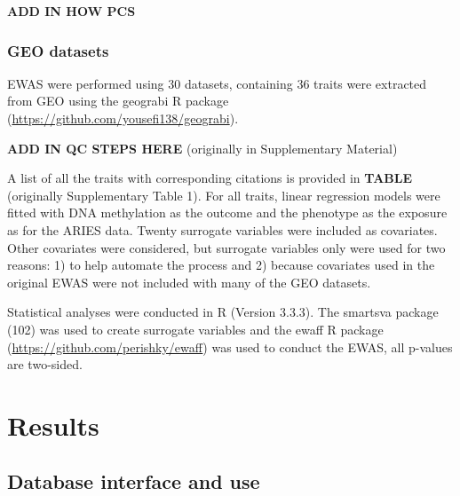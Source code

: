 \documentclass[11pt,twoside]{bristolthesis}
\begin{document}
\textbf{ADD IN HOW PCS}

\hypertarget{geo-datasets}{%
\subsubsection{GEO datasets}\label{geo-datasets}}

EWAS were performed using 30 datasets, containing 36 traits were extracted from GEO using the geograbi R package (\url{https://github.com/yousefi138/geograbi}).

\textbf{ADD IN QC STEPS HERE} (originally in Supplementary Material)

A list of all the traits with corresponding citations is provided in \textbf{TABLE} (originally Supplementary Table 1).
For all traits, linear regression models were fitted with DNA methylation as the outcome and the phenotype as the exposure as for the ARIES data. Twenty surrogate variables were included as covariates. Other covariates were considered, but surrogate variables only were used for two reasons: 1) to help automate the process and 2) because covariates used in the original EWAS were not included with many of the GEO datasets.

Statistical analyses were conducted in R (Version 3.3.3). The smartsva package (102) was used to create surrogate variables and the ewaff R package (\url{https://github.com/perishky/ewaff}) was used to conduct the EWAS, all p-values are two-sided.

\hypertarget{results}{%
\section{Results}\label{results}}

\hypertarget{database-interface-and-use}{%
\subsection{Database interface and use}\label{database-interface-and-use}}
\end{document}
